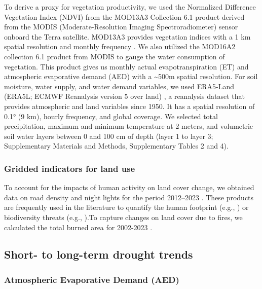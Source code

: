 \documentclass[
  sn-nature,
  numbered]{sn-jnl}
\begin{document}
To derive a proxy for vegetation productivity, we used the Normalized
Difference Vegetation Index (NDVI) from the MOD13A3 Collection 6.1
product derived from the MODIS (Moderate-Resolution Imaging
Spectroradiometer) sensor onboard the Terra satellite. MOD13A3 provides
vegetation indices with a 1 km spatial resolution and monthly frequency
\citep{Didan2015}. We also utilized the MOD16A2 collection 6.1
\citep{Running2017} product from MODIS to gauge the water consumption of
vegetation. This product gives us monthly actual evapotranspiration (ET)
and atmospheric evaporative demand (AED) with a \textasciitilde500m
spatial resolution. For soil moisture, water supply, and water demand
variables, we used ERA5-Land (ERA5L; ECMWF Reanalysis version 5 over
land) \citep{MunozSabater2021}, a reanalysis dataset that provides
atmospheric and land variables since 1950. It has a spatial resolution
of 0.1° (9 km), hourly frequency, and global coverage. We selected total
precipitation, maximum and minimum temperature at 2 meters, and
volumetric soil water layers between 0 and 100 cm of depth (layer 1 to
layer 3; Supplementary Materials and Methods, Supplementary Tables 2 and
4).

\subsubsection{Gridded indicators for land
use}\label{gridded-indicators-for-land-use}

To account for the impacts of human activity on land cover change, we
obtained data on road density \citep{Meijer2018} and night lights for
the period 2012--2023 \citep{Roman2018}. These products are frequently
used in the literature to quantify the human footprint (e.g.,
\citep{Halpern2015, Halpern2008}) or biodiversity threats (e.g.,
\citep{Bowler2020, Kennedy2020}).To capture changes on land cover due to
fires, we calculated the total burned area for 2002-2023
\citep{Chen2023}.

\subsection{Short- to long-term drought
trends}\label{short--to-long-term-drought-trends}

\subsubsection{Atmospheric Evaporative Demand
(AED)}\label{atmospheric-evaporative-demand-aed}
\end{document}
